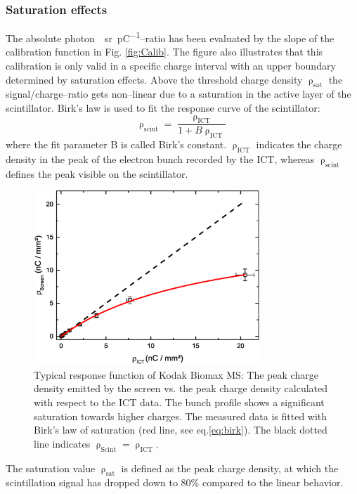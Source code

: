 \documentclass[%
reprint,
amsmath,
amssymb,
aip,
rsi, 
numerical,
floatfix,
]{revtex4-1}
\begin{document}
\subsubsection{\label{Se}Saturation effects}
The absolute \si{photon \per \steradian \per \pico\coulomb}--ratio has been evaluated by the slope of the calibration function in Fig. \ref{fig:Calib}. 
The figure also illustrates that this calibration is only valid in a specific charge interval with an upper boundary determined by saturation effects. 
Above the threshold charge density $\uprho_{\text{sat}}$ the signal/charge--ratio gets non--linear due to a saturation in the active layer of the scintillator.
Birk’s law is used to fit the response curve of the scintillator:
\begin{equation}
\uprho_{\text{scint}} = \frac{\uprho_{\text{ICT}}}{1+B\uprho_{\text{ICT}}}
\label{eq:birk}
\end{equation}
where the fit parameter B is called Birk's constant.
$\uprho_{\text{ICT}}$ indicates the charge density in the peak of the electron bunch recorded by the ICT, whereas $\uprho_{\text{scint}}$ defines the peak visible on the scintillator.
\begin{figure}
\includegraphics[width=8.5cm]{./Figures/Sat}%
\caption{\label{fig:Sat} Typical response function of Kodak Biomax MS: The peak charge density emitted by the screen vs. the peak charge density calculated with respect to the ICT data. 
The bunch profile shows a significant saturation towards higher charges. 
The measured data is fitted with Birk's law of saturation (red line, see eq.\ref{eq:birk}). 
The black dotted line indicates $\uprho_{\text{Scint}} = \uprho_{\text{ICT}}$.}
\end{figure}
The saturation value $\uprho_{\text{sat}}$ is defined as the peak charge density, at which the scintillation signal has dropped down to 80$\%$ compared to the linear behavior.
\end{document}
